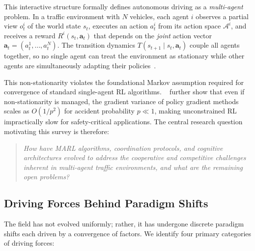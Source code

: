 \documentclass[12pt, a4paper]{article}
\begin{document}
This interactive structure formally defines autonomous driving as a
\emph{multi-agent} problem.  In a traffic environment with $N$ vehicles,
each agent $i$ observes a partial view $o^i_t$ of the world state $s_t$,
executes an action $a^i_t$ from its action space $\mathcal{A}^i$, and
receives a reward $R^i(s_t, \mathbf{a}_t)$ that depends on the
\emph{joint} action vector $\mathbf{a}_t = (a^1_t, \ldots, a^N_t)$.
The transition dynamics
$T(s_{t+1} \mid s_t, \mathbf{a}_t)$ couple all agents together, so
no single agent can treat the environment as stationary while other
agents are simultaneously adapting their
policies~\cite{zhang2021multi,busoniu2008comprehensive}.

This non-stationarity violates the foundational Markov assumption required
for convergence of standard single-agent RL algorithms.  \citeauthor{shalev2016safe}~\cite{shalev2016safe}
further show that even if non-stationarity is managed, the gradient
variance of policy gradient methods scales as $O(1/p^2)$ for accident
probability $p \ll 1$, making unconstrained RL impractically slow for
safety-critical applications.  The central research question motivating
this survey is therefore:

\begin{quote}
\emph{How have MARL algorithms, coordination protocols, and cognitive
architectures evolved to address the cooperative and competitive challenges
inherent in multi-agent traffic environments, and what are the remaining
open problems?}
\end{quote}

\subsection{Driving Forces Behind Paradigm Shifts}
\label{sec:drivers}

The field has not evolved uniformly; rather, it has undergone discrete
paradigm shifts each driven by a convergence of factors.  We identify four
primary categories of driving forces:
\end{document}
